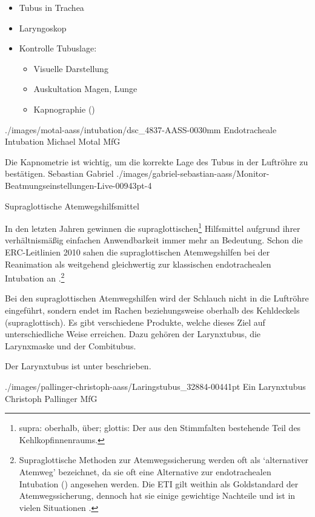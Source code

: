 {%
\begin{itemize}
  \item Tubus in Trachea
  \item Laryngoskop
  \item Kontrolle Tubuslage:
  \begin{itemize}
    \item Visuelle Darstellung
    \item Auskultation Magen, Lunge
    \item Kapnographie ()
  \end{itemize}
\end{itemize}
}%
{./images/motal-aass/intubation/dsc_4837-AASS-0030mm}%
{Endotracheale Intubation}%
{}%
{Michael Motal}%
{MfG}%

\begin{Synopsis}
\end{Synopsis}



{Die Kapnometrie ist wichtig, um die korrekte Lage des Tubus in der Luftröhre zu bestätigen.}%
{}%
{Sebastian Gabriel}%
{}%
{./images/gabriel-sebastian-aass/Monitor-Beatmungseinstellungen-Live-00943pt-4}%
{}%

\clearpage%

\TextSlidePicture
{Supraglottische Atemwegshilfsmittel}%
{%
In den letzten Jahren gewinnen die
supraglottischen\footnote{ supra: oberhalb, über;
 glottis: Der aus den Stimmfalten bestehende
Teil des Kehlkopfinnenraums.} Hilfsmittel aufgrund ihrer
verhältnismäßig einfachen Anwendbarkeit immer mehr an
Bedeutung. Schon die ERC-Leitlinien 2010 sahen die
supraglottischen Atemwegshilfen bei der Reanimation als
weitgehend gleichwertig zur klassischen endotrachealen
Intubation an
\cite[p.1319,1321]{Erc2010Sec4}.\footnote{Supraglottische
Methoden zur Atemwegssicherung werden oft als
\enquote*{alternativer Atemweg} bezeichnet, da sie oft eine
Alternative zur endotrachealen Intubation ()
angesehen werden. Die ETI gilt weithin als Goldstandard der
Atemwegssicherung, dennoch hat sie einige gewichtige
Nachteile und ist in vielen Situationen . }

Bei den supraglottischen Atemwegshilfen wird der Schlauch
nicht in die Luftröhre eingeführt, sondern endet im Rachen
beziehungsweise oberhalb des Kehldeckels (supraglottisch).
Es gibt verschiedene Produkte, welche dieses Ziel auf
unterschiedliche Weise erreichen. Dazu gehören der
Larynxtubus{\texttrademark}, die Larynxmaske und der Combitubus.

Der Larynxtubus{\texttrademark} ist unter  beschrieben.
}%
{}%
{./images/pallinger-christoph-aass/Laringstubus_32884-00441pt}%
{Ein Larynxtubus}%
{}%
{Christoph Pallinger}%
{MfG}%




